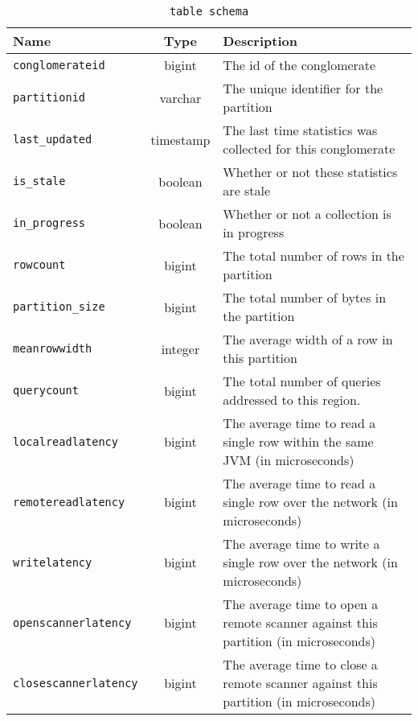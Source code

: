 \begin{table}
	\begin{tabular}{|l|c|p{6cm}|}
		\hline
		\bf{Name}											&	\bf{Type}	& \bf{Description} \\ \hline
		\texttt{conglomerateid}				&	bigint		& The id of the conglomerate \\ \hline
		\texttt{partitionid}					&	varchar		&	The unique identifier for the partition \\ \hline
		\texttt{last\_updated}				&	timestamp	&	The last time statistics was collected for this conglomerate \\ \hline
		\texttt{is\_stale}						&	boolean		&	Whether or not these statistics are stale \\ \hline
		\texttt{in\_progress}					&	boolean		&	Whether or not a collection is in progress \\ \hline
		\texttt{rowcount}							&	bigint		&	The total number of rows in the partition \\ \hline
		\texttt{partition\_size}			&	bigint		&	The total number of bytes in the partition \\ \hline
		\texttt{meanrowwidth}					&	integer		&	The average width of a row in this partition \\ \hline
		\texttt{querycount}						&	bigint		&	The total number of queries addressed to this region. \\ \hline
		\texttt{localreadlatency}			&	bigint		&	The average time to read a single row within the same JVM (in microseconds) \\ \hline
		\texttt{remotereadlatency}		&	bigint		&	The average time to read a single row over the network (in microseconds) \\ \hline
		\texttt{writelatency}					&	bigint		&	The average time to write a single row over the network (in microseconds) \\ \hline
		\texttt{openscannerlatency} 	&	bigint		&	The average time to open a remote scanner against this partition (in microseconds) \\ \hline
		\texttt{closescannerlatency}	&	bigint		&	The average time to close a remote scanner against this partition (in microseconds) \\ \hline
	\end{tabular}
	\caption{\texttt{\systablestats table schema}}
	\label{table:tableStats}
\end{table}

